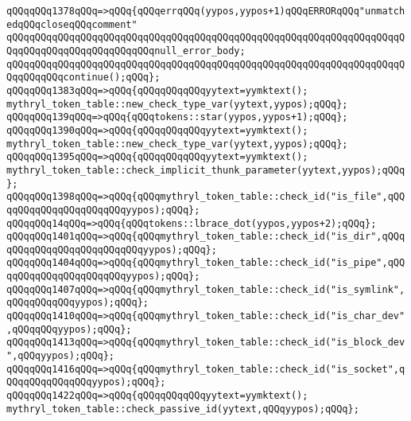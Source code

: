 \verb|qQQqqQQq1378qQQq=>qQQq{qQQqerrqQQq(yypos,yypos+1)qQQqERRORqQQq"unmatchedqQQqcloseqQQqcomment"|\newline
\verb|qQQqqQQqqQQqqQQqqQQqqQQqqQQqqQQqqQQqqQQqqQQqqQQqqQQqqQQqqQQqqQQqqQQqqQQqqQQqqQQqqQQqqQQqqQQqqQQqnull_error_body;|\newline
\verb|qQQqqQQqqQQqqQQqqQQqqQQqqQQqqQQqqQQqqQQqqQQqqQQqqQQqqQQqqQQqqQQqqQQqqQQqqQQqqQQqcontinue();qQQq};|\newline
\verb|qQQqqQQq1383qQQq=>qQQq{qQQqqQQqqQQqyytext=yymktext();|\newline
\verb|mythryl_token_table::new_check_type_var(yytext,yypos);qQQq};|\newline
\verb|qQQqqQQq139qQQq=>qQQq{qQQqtokens::star(yypos,yypos+1);qQQq};|\newline
\verb|qQQqqQQq1390qQQq=>qQQq{qQQqqQQqqQQqyytext=yymktext();|\newline
\verb|mythryl_token_table::new_check_type_var(yytext,yypos);qQQq};|\newline
\verb|qQQqqQQq1395qQQq=>qQQq{qQQqqQQqqQQqyytext=yymktext();|\newline
\verb|mythryl_token_table::check_implicit_thunk_parameter(yytext,yypos);qQQq};|\newline
\verb|qQQqqQQq1398qQQq=>qQQq{qQQqmythryl_token_table::check_id("is_file",qQQqqQQqqQQqqQQqqQQqqQQqyypos);qQQq};|\newline
\verb|qQQqqQQq14qQQq=>qQQq{qQQqtokens::lbrace_dot(yypos,yypos+2);qQQq};|\newline
\verb|qQQqqQQq1401qQQq=>qQQq{qQQqmythryl_token_table::check_id("is_dir",qQQqqQQqqQQqqQQqqQQqqQQqqQQqyypos);qQQq};|\newline
\verb|qQQqqQQq1404qQQq=>qQQq{qQQqmythryl_token_table::check_id("is_pipe",qQQqqQQqqQQqqQQqqQQqqQQqyypos);qQQq};|\newline
\verb|qQQqqQQq1407qQQq=>qQQq{qQQqmythryl_token_table::check_id("is_symlink",qQQqqQQqqQQqyypos);qQQq};|\newline
\verb|qQQqqQQq1410qQQq=>qQQq{qQQqmythryl_token_table::check_id("is_char_dev",qQQqqQQqyypos);qQQq};|\newline
\verb|qQQqqQQq1413qQQq=>qQQq{qQQqmythryl_token_table::check_id("is_block_dev",qQQqyypos);qQQq};|\newline
\verb|qQQqqQQq1416qQQq=>qQQq{qQQqmythryl_token_table::check_id("is_socket",qQQqqQQqqQQqqQQqyypos);qQQq};|\newline
\verb|qQQqqQQq1422qQQq=>qQQq{qQQqqQQqqQQqyytext=yymktext();|\newline
\verb|mythryl_token_table::check_passive_id(yytext,qQQqyypos);qQQq};|\newline
